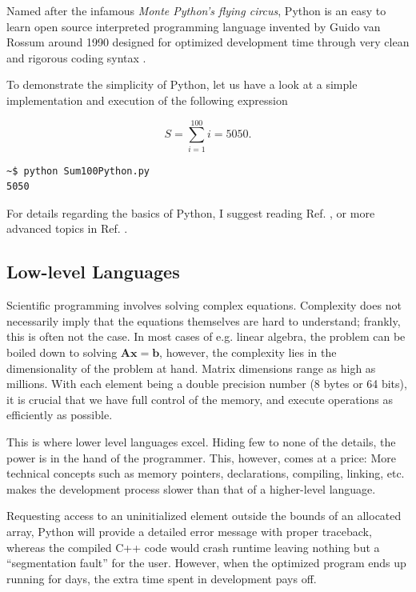 Named after the infamous \textit{Monte Python's flying circus}, Python is an easy to learn open source interpreted programming language invented by Guido van Rossum around 1990 designed for optimized development time through very clean and rigorous coding syntax \cite{inf1100, pythonBook}. 

To demonstrate the simplicity of Python, let us have a look at a simple implementation and execution of the following expression

\[
 S = \sum_{i=1}^{100} i = 5050.  \label{eq:sum100}
\]




\begin{verbatim}
~$ python Sum100Python.py 
5050
\end{verbatim}

 For details regarding the basics of Python, I suggest reading Ref. \cite{inf1100}, or more advanced topics in Ref. \cite{inf3331}.  


\subsection{Low-level Languages}
\label{sec:lowlevel}

Scientific programming involves solving complex equations. Complexity does not necessarily imply that the equations themselves are hard to understand; frankly, this is often not the case. In most cases of e.g. linear algebra, the problem can be boiled down to solving $\mathbf{A}\mathbf{x} = \mathbf{b}$, however, the complexity lies in the dimensionality of the problem at hand. Matrix dimensions range as high as millions. With each element being a double precision number (8 bytes or 64 bits), it is crucial that we have full control of the memory, and execute operations as efficiently as possible. 

This is where lower level languages excel. Hiding few to none of the details, the power is in the hand of the programmer. This, however, comes at a price: More technical concepts such as memory pointers, declarations, compiling, linking, etc. makes the development process slower than that of a higher-level language. 

Requesting access to an uninitialized element outside the bounds of an allocated array, Python will provide a detailed error message with proper traceback, whereas the compiled C++ code would crash runtime leaving nothing but a ``segmentation fault'' for the user. However, when the optimized program ends up running for days, the extra time spent in development pays off. 

